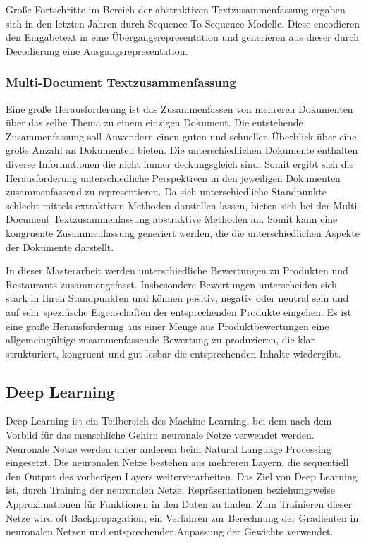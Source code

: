 Große Fortschritte im Bereich der abstraktiven Textzusammenfassung ergaben sich in den letzten Jahren durch Sequence-To-Sequence Modelle. Diese encodieren den Eingabetext in eine Übergangsrepresentation und generieren aus dieser durch Decodierung eine Ausgangsrepresentation.

\subsubsection{Multi-Document Textzusammenfassung}
Eine große Herausforderung ist das Zusammenfassen von mehreren Dokumenten über das selbe Thema zu einem einzigen Dokument. 
Die entstehende Zusammenfassung soll Anwendern einen guten und schnellen Überblick über eine große Anzahl an Dokumenten bieten. 
Die unterschiedlichen Dokumente enthalten diverse Informationen die nicht immer deckungsgleich sind. 
Somit ergibt sich die Herausforderung unterschiedliche Perspektiven in den jeweiligen Dokumenten zusammenfassend zu representieren.
Da sich unterschiedliche Standpunkte schlecht mittels extraktiven Methoden darstellen lassen, bieten sich bei der Multi-Document Textzusammenfassung abstraktive Methoden an.
Somit kann eine kongruente Zusammenfassung generiert werden, die die unterschiedlichen Aspekte der Dokumente darstellt.

In dieser Masterarbeit werden unterschiedliche Bewertungen zu Produkten und Restaurants zusammengefasst. Insbesondere Bewertungen unterscheiden sich stark in Ihren Standpunkten und können positiv, negativ oder neutral sein und auf sehr spezifische Eigenschaften der entsprechenden Produkte eingehen.
Es ist eine große Herausforderung aus einer Menge aus Produktbewertungen eine allgemeingültige zusammenfassende Bewertung zu produzieren, die klar strukturiert, kongruent und gut lesbar die entsprechenden Inhalte wiedergibt.

\subsection{Deep Learning}
Deep Learning ist ein Teilbereich des Machine Learning, bei dem nach dem Vorbild für das menschliche Gehirn neuronale Netze verwendet werden. 
Neuronale Netze werden unter anderem beim Natural Language Processing eingesetzt. 
Die neuronalen Netze bestehen aus mehreren Layern, die sequentiell den Output des vorherigen Layers weiterverarbeiten. 
Das Ziel von Deep Learning ist, durch Training der neuronalen Netze, Repräsentationen beziehungsweise Approximationen für Funktionen in den Daten zu finden.
Zum Trainieren dieser Netze wird oft Backpropagation, ein Verfahren zur Berechnung der Gradienten in neuronalen Netzen und entsprechender Anpassung der Gewichte verwendet.

